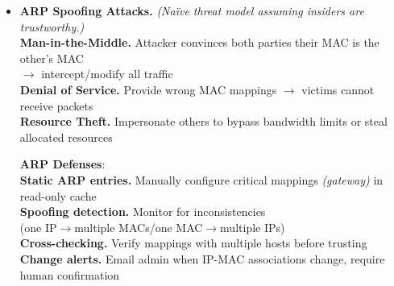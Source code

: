 \documentclass[9pt, a4paper]{extarticle}
\begin{document}
\begin{minipage}[t]{0.5\textwidth}
\begin{itemize}[leftmargin=4px]
\begin{minipage}[htp]{0.55\textwidth}
			      \textbf{HLEN} (1 byte): Hardware address length (6 for MAC)\\
			      \textbf{PLEN} (1 byte): Protocol address length (4 for IPv4)\\
			      \textbf{OPERATION} (2 bytes): 1 = Request, 2 = Reply
		      \end{minipage}\hfill
		      \begin{minipage}[htp]{0.45\textwidth}
			      \textbf{Sender HA}: MAC address of sender\\
			      \textbf{Sender PA}: IP address of sender\\
			      \textbf{Target HA}: MAC of target \\(zero in Request, filled in Reply)\\
			      \textbf{Target PA}: IP address being queried
		      \end{minipage}
		\item[] \begin{minipage}[htp]{0.46\textwidth}
			      \textbf{ARP Spoofing Attacks.}
			      \textit{(Naïve threat model assuming insiders are trustworthy.)}\\
			      \textbf{Man-in-the-Middle.} Attacker convinces both parties their MAC is the other's MAC \\$\rightarrow$ intercept/modify all traffic\\
				      \textbf{Denial of Service.} Provide wrong MAC mappings $\rightarrow$ victims cannot receive packets\\
			      \textbf{Resource Theft.} Impersonate others to bypass bandwidth limits or steal allocated resources
		      \end{minipage}\hfill\vline\hfill
		      \begin{minipage}[htp]{0.5\textwidth}
			      \textbf{ARP Defenses}:\\
			      \textbf{Static ARP entries.} Manually configure critical mappings \textit{(gateway)} in read-only cache\\
			      \textbf{Spoofing detection.} Monitor for inconsistencies\\(one IP$\rightarrow$multiple MACs/one MAC$\rightarrow$multiple IPs)\\
			      \textbf{Cross-checking.} Verify mappings with multiple hosts before trusting\\
			      \textbf{Change alerts.} Email admin when IP-MAC associations change, require human confirmation
		      \end{minipage}
	\end{itemize}

\end{minipage}
\end{document}
